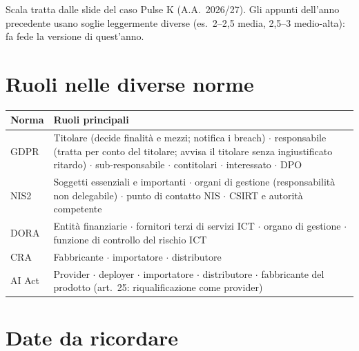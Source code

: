 \begin{nota}
Scala tratta dalle slide del caso Pulse K (A.A.~2026/27). Gli appunti dell'anno precedente usano
soglie leggermente diverse (es.\ 2--2,5 media, 2,5--3 medio-alta): fa fede la versione di quest'anno.
\end{nota}

\section{Ruoli nelle diverse norme}

\begin{center}
\small
\begin{tabularx}{\linewidth}{l X}
\toprule
\textbf{Norma} & \textbf{Ruoli principali} \\ \midrule
GDPR    & Titolare (decide finalità e mezzi; notifica i breach) $\cdot$ responsabile (tratta per conto
  del titolare; avvisa il titolare senza ingiustificato ritardo) $\cdot$ sub-responsabile $\cdot$
  contitolari $\cdot$ interessato $\cdot$ DPO \\
NIS2    & Soggetti essenziali e importanti $\cdot$ organi di gestione (responsabilità non delegabile)
  $\cdot$ punto di contatto NIS $\cdot$ CSIRT e autorità competente \\
DORA    & Entità finanziarie $\cdot$ fornitori terzi di servizi ICT $\cdot$ organo di gestione
  $\cdot$ funzione di controllo del rischio ICT \\
CRA     & Fabbricante $\cdot$ importatore $\cdot$ distributore \\
AI Act  & Provider $\cdot$ deployer $\cdot$ importatore $\cdot$ distributore $\cdot$ fabbricante del
  prodotto (art.~25: riqualificazione come provider) \\ \bottomrule
\end{tabularx}
\end{center}

\section{Date da ricordare}

